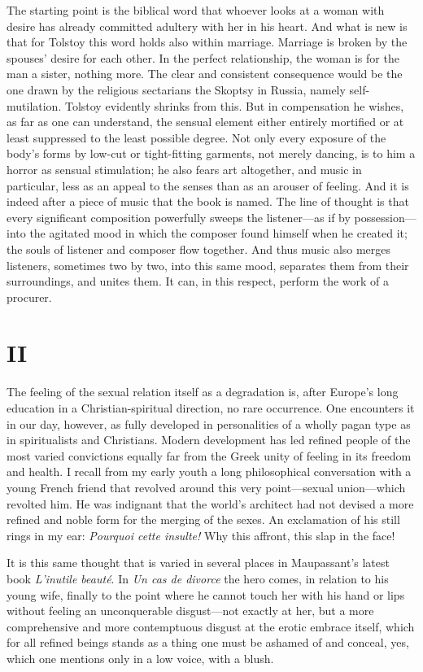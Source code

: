 \documentclass[12pt,a4paper]{article}
\begin{document}
The starting point is the biblical word that whoever looks at a woman
with desire has already committed adultery with her in his heart. And
what is new is that for Tolstoy this word holds also within marriage.
Marriage is broken by the spouses' desire for each other. In the
perfect relationship, the woman is for the man a sister, nothing more.
The clear and consistent consequence would be the one drawn by the
religious sectarians the Skoptsy in Russia, namely self-mutilation.
Tolstoy evidently shrinks from this. But in compensation he wishes,
as far as one can understand, the sensual element either entirely
mortified or at least suppressed to the least possible degree. Not
only every exposure of the body's forms by low-cut or tight-fitting
garments, not merely dancing, is to him a horror as sensual
stimulation; he also fears art altogether, and music in particular,
less as an appeal to the senses than as an arouser of feeling. And
it is indeed after a piece of music that the book is named. The line
of thought is that every significant composition powerfully sweeps
the listener---as if by possession---into the agitated mood in which
the composer found himself when he created it; the souls of listener
and composer flow together. And thus music also merges listeners,
sometimes two by two, into this same mood, separates them from their
surroundings, and unites them. It can, in this respect, perform the
work of a procurer.

\section*{II}

The feeling of the sexual relation itself as a degradation is, after
Europe's long education in a Christian-spiritual direction, no rare
occurrence. One encounters it in our day, however, as fully developed
in personalities of a wholly pagan type as in spiritualists and
Christians. Modern development has led refined people of the most
varied convictions equally far from the Greek unity of feeling in its
freedom and health. I recall from my early youth a long philosophical
conversation with a young French friend that revolved around this very
point---sexual union---which revolted him. He was indignant that the
world's architect had not devised a more refined and noble form for
the merging of the sexes. An exclamation of his still rings in my ear:
\textit{Pourquoi cette insulte!} Why this affront, this slap in the
face!

It is this same thought that is varied in several places in Maupassant's
latest book \textit{L'inutile beauté}. In \textit{Un cas de divorce} the
hero comes, in relation to his young wife, finally to the point where
he cannot touch her with his hand or lips without feeling an
unconquerable disgust---not exactly at her, but a more comprehensive
and more contemptuous disgust at the erotic embrace itself, which for
all refined beings stands as a thing one must be ashamed of and conceal,
yes, which one mentions only in a low voice, with a blush.
\end{document}
